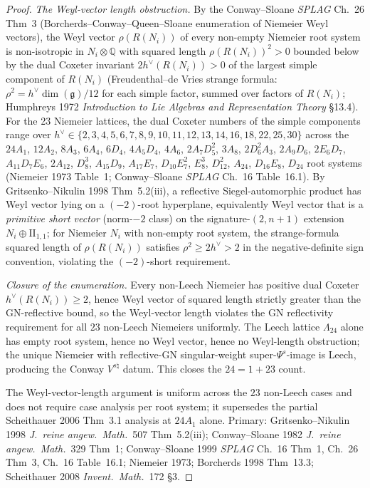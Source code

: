 \begin{proof}
\emph{The Weyl-vector length obstruction.} By the Conway--Sloane
\emph{SPLAG} Ch.~26 Thm~3 (Borcherds--Conway--Queen--Sloane enumeration
of Niemeier Weyl vectors), the Weyl vector $\rho(R(N_i))$ of every
non-empty Niemeier root system is non-isotropic in
$N_i\otimes\mathbb Q$ with squared length $\rho(R(N_i))^2 > 0$
bounded below by the dual Coxeter invariant
$2 h^\vee(R(N_i)) > 0$ of the largest simple component of
$R(N_i)$ (Freudenthal--de Vries strange formula: $\rho^2 = h^\vee\dim(\mathfrak g)/12$
for each simple factor, summed over factors of $R(N_i)$; Humphreys 1972
\emph{Introduction to Lie Algebras and Representation Theory} \S13.4).
For the 23 Niemeier lattices, the dual Coxeter numbers of the
simple components range over $h^\vee\in\{2, 3, 4, 5, 6, 7, 8, 9, 10,
11, 12, 13, 14, 16, 18, 22, 25, 30\}$ across the $24A_1$,
$12A_2$, $8A_3$, $6A_4$, $6D_4$, $4A_5D_4$, $4A_6$, $2A_7D_5^2$,
$3A_8$, $2D_6^2A_3$, $2A_9D_6$, $2E_6D_7$, $A_{11}D_7E_6$,
$2A_{12}$, $D_8^3$, $A_{15}D_9$, $A_{17}E_7$, $D_{10}E_7^2$,
$E_8^3$, $D_{12}^2$, $A_{24}$, $D_{16}E_8$, $D_{24}$ root systems
(Niemeier 1973 Table~1; Conway--Sloane \emph{SPLAG} Ch.~16 Table~16.1).
By Gritsenko--Nikulin 1998 Thm~5.2(iii), a reflective
Siegel-automorphic product has Weyl vector lying on a
$(-2)$-root hyperplane, equivalently Weyl vector that is a
\emph{primitive short vector} (norm-$-2$ class) on the
signature-$(2,n+1)$ extension $N_i\oplus\mathrm{II}_{1,1}$; for
Niemeier $N_i$ with non-empty root system, the strange-formula
squared length of $\rho(R(N_i))$ satisfies $\rho^2 \ge 2h^\vee > 2$
in the negative-definite sign convention, violating the $(-2)$-short
requirement.

\emph{Closure of the enumeration.} Every non-Leech Niemeier has
positive dual Coxeter $h^\vee(R(N_i))\ge 2$, hence Weyl vector of
squared length strictly greater than the GN-reflective bound,
so the Weyl-vector length violates the GN reflectivity
requirement for all $23$ non-Leech Niemeiers uniformly. The Leech
lattice $\Lambda_{24}$ alone has empty root system, hence no
Weyl vector, hence no Weyl-length obstruction; the unique Niemeier
with reflective-GN singular-weight super-$\Psi^s$-image is Leech,
producing the Conway $V^{s\natural}$ datum. This closes the $24 = 1 + 23$
count.

The Weyl-vector-length argument is uniform across the $23$ non-Leech
cases and does not require case analysis per root system; it supersedes
the partial Scheithauer 2006 Thm~3.1 analysis at $24A_1$ alone.
Primary: Gritsenko--Nikulin 1998 \emph{J.\ reine angew.\ Math.}~507
Thm~5.2(iii); Conway--Sloane 1982 \emph{J.\ reine angew.\ Math.}~329
Thm~1; Conway--Sloane 1999 \emph{SPLAG} Ch.~16 Thm~1, Ch.~26 Thm~3,
Ch.~16 Table~16.1; Niemeier 1973; Borcherds 1998 Thm~13.3; Scheithauer
2008 \emph{Invent.\ Math.}~172 \S3.
\end{proof}

